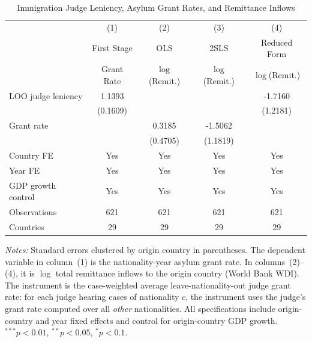 \begin{table}[!t]
\centering
\caption{Immigration Judge Leniency, Asylum Grant Rates, and Remittance Inflows}
\label{tab:main}
\begin{threeparttable}
\begin{tabular}{lcccc}
\hline\hline
 & (1) & (2) & (3) & (4) \\
 & First Stage & OLS & 2SLS & Reduced Form \\
 & Grant Rate & $\log$(Remit.) & $\log$(Remit.) & $\log$(Remit.) \\
\hline
LOO judge leniency & 1.1393 & & & -1.7160 \\
 & (0.1609) & & & (1.2181) \\
Grant rate & & 0.3185 & -1.5062 & \\
 & & (0.4705) & (1.1819) & \\
\hline
Country FE & Yes & Yes & Yes & Yes \\
Year FE & Yes & Yes & Yes & Yes \\
GDP growth control & Yes & Yes & Yes & Yes \\
Observations & 621 & 621 & 621 & 621 \\
Countries & 29 & 29 & 29 & 29 \\

\hline\hline
\end{tabular}
\begin{tablenotes}[flushleft]
\small
\item \textit{Notes:} Standard errors clustered by origin country in parentheses. The dependent variable in column~(1) is the nationality-year asylum grant rate. In columns~(2)--(4), it is $\log$ total remittance inflows to the origin country (World Bank WDI). The instrument is the case-weighted average leave-nationality-out judge grant rate: for each judge hearing cases of nationality $c$, the instrument uses the judge's grant rate computed over all \emph{other} nationalities. All specifications include origin-country and year fixed effects and control for origin-country GDP growth. $^{***}p<0.01$, $^{**}p<0.05$, $^{*}p<0.1$.
\end{tablenotes}
\end{threeparttable}
\end{table}
